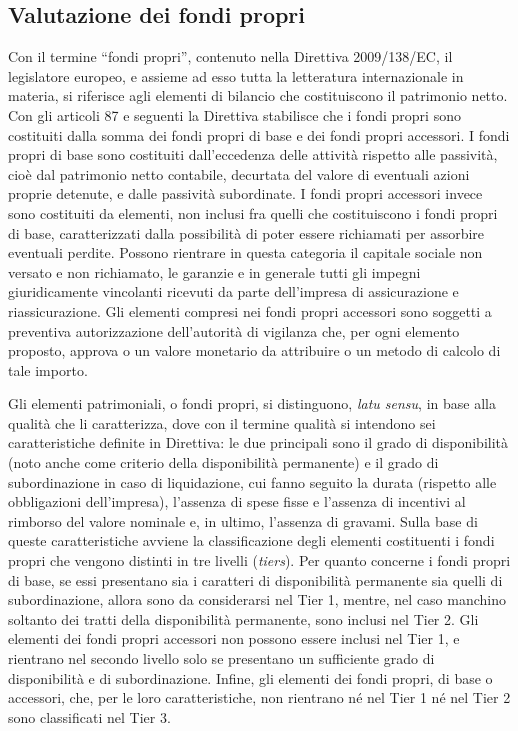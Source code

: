 \subsection{Valutazione dei fondi propri}
Con il termine “fondi propri”, contenuto nella Direttiva 2009/138/EC, il legislatore europeo, e assieme ad esso tutta la letteratura internazionale in materia, si riferisce agli elementi di bilancio che costituiscono il patrimonio netto. 
Con gli articoli 87 e seguenti la Direttiva stabilisce che i fondi propri sono costituiti dalla somma dei fondi propri di base e dei fondi propri accessori. 
I fondi propri di base sono costituiti dall’eccedenza delle attività rispetto alle passività, cioè dal patrimonio netto contabile, decurtata del valore di eventuali azioni proprie detenute, e dalle passività subordinate.
I fondi propri accessori invece sono costituiti da elementi, non inclusi fra quelli che costituiscono i fondi propri di base, caratterizzati dalla possibilità di poter essere richiamati per assorbire eventuali perdite. Possono rientrare in questa categoria il capitale sociale non versato e non richiamato, le garanzie e in generale tutti gli impegni giuridicamente vincolanti ricevuti da parte dell’impresa di assicurazione e riassicurazione. Gli elementi compresi nei fondi propri accessori sono soggetti a preventiva autorizzazione dell’autorità di vigilanza che, per ogni elemento proposto, approva o un valore monetario da attribuire o un metodo di calcolo di tale importo.

Gli elementi patrimoniali, o fondi propri, si distinguono, {\itshape latu sensu}, in base alla qualità che li caratterizza, dove con il termine qualità si intendono sei caratteristiche definite in Direttiva: le due principali sono il grado di disponibilità (noto anche come criterio della disponibilità permanente) e il grado di subordinazione in caso di liquidazione, cui fanno seguito la durata (rispetto alle obbligazioni dell’impresa), l’assenza di spese fisse e l’assenza di incentivi al rimborso del valore nominale e, in ultimo, l’assenza di gravami.
Sulla base di queste caratteristiche avviene la classificazione degli elementi costituenti i fondi propri che vengono distinti in tre livelli (\textit{tiers}). Per quanto concerne i fondi propri di base, se essi presentano sia i caratteri di disponibilità permanente sia quelli di subordinazione, allora sono da considerarsi nel Tier 1, mentre, nel caso manchino soltanto dei tratti della disponibilità permanente, sono inclusi nel Tier 2. Gli elementi dei fondi propri accessori non possono essere inclusi nel Tier 1, e rientrano nel secondo livello solo se presentano un sufficiente grado di disponibilità e di subordinazione. Infine, gli elementi dei fondi propri, di base o accessori, che, per le loro caratteristiche, non rientrano né nel Tier 1 né nel Tier 2 sono classificati nel Tier 3.

